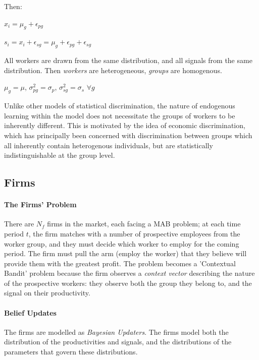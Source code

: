 \documentclass[]{article}
\begin{document}
Then:
\begin{center}
	$x_i = \mu_g + \epsilon_{pg}$
	
	\vspace{0.2cm}
	
	$s_i = x_i + \epsilon_{sg} = \mu_g + \epsilon_{pg} + \epsilon_{sg}$
	
\end{center}

All workers are drawn from the same distribution, and all signals from the same distribution. Then \textit{workers} are heterogeneous, \textit{groups} are homogenous.
\begin{center}
	$\mu_g = \mu$, \hspace*{0.2cm}
	$ \sigma_{pg}^2 = \sigma_p$,\hspace*{0.2cm}
	$ \sigma_{sg}^2 = \sigma_s$ \hspace*{0.2cm} $ \forall g$
\end{center}

Unlike other models of statistical discrimination, the nature of endogenous learning within the model does not necessitate the groups of workers to be inherently different. This is motivated by the idea of economic discrimination, which has principally been concerned with discrimination between groups which all inherently contain heterogenous individuals, but are statistically indistinguishable at the group level.

\subsection{Firms}

\paragraph{The Firms' Problem}There are $N_f$ firms in the market, each facing a MAB problem; at each time period $t$, the firm matches with a number of prospective employees from the worker group, and they must decide which worker to employ for the coming period. The firm must pull the arm (employ the worker) that they believe will provide them with the greatest profit. 
The problem becomes a 'Contextual Bandit' problem because the firm observes a \textit{context vector} describing the nature of the prospective workers: they observe both the group they belong to, and the signal on their productivity.

\paragraph{Belief Updates}The firms are modelled as \textit{Bayesian Updaters}. The firms model both the distribution of the productivities and signals, and the distributions of the parameters that govern these distributions.
\end{document}
